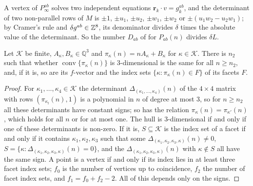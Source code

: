 A vertex of $P_\infty^{ab}$ solves two independent equations $\mathbf r_k\cdot v=g^{ab}_k$, and the determinant of two non-parallel rows of $M$ is $\pm1$, $\pm u_1$, $\pm u_2$, $\pm w_1$, $\pm w_2$ or $\pm(u_1w_2-u_2w_1)$; by Cramer's rule and $\delta g^{ab}\in\mathbb{Z}^8$, its denominator divides $\delta$ times the absolute value of the determinant.
So the number $D_{ab}$ of  for $P_{ab}(n)$ divides $\delta L$.

\begin{lemma}
\label{lem:moving-points}
Let $\mathcal K$ be finite, $A_\kappa,B_\kappa\in\mathbb Q^3$ and $\pi_\kappa(n)=nA_\kappa+B_\kappa$ for $\kappa\in\mathcal K$.
There is $n_2$ such that whether $\operatorname{conv}\{\pi_\kappa(n)\}$ is $3$-dimensional is the same for all $n\ge n_2$, and, if it is, so are its $f$-vector and the index sets $\{\kappa:\pi_\kappa(n)\in F\}$ of its facets $F$.
\end{lemma}

\begin{proof}
For $\kappa_1,\dots,\kappa_4\in\mathcal K$ the determinant $\Delta_{(\kappa_1,\dots,\kappa_4)}(n)$ of the $4\times4$ matrix with rows $(\pi_{\kappa_l}(n),1)$ is a polynomial in $n$ of degree at most $3$, so for $n\ge n_2$ all these determinants have constant signs; so has the relation $\pi_\kappa(n)=\pi_{\kappa'}(n)$, which holds for all $n$ or for at most one.
The hull is $3$-dimensional if and only if one of these determinants is non-zero.
If it is, $S\subseteq\mathcal K$ is the index set of a facet if and only if it contains $\kappa_1,\kappa_2,\kappa_3$ such that some $\Delta_{(\kappa_1,\kappa_2,\kappa_3,\kappa)}(n)\ne0$, $S=\{\kappa:\Delta_{(\kappa_1,\kappa_2,\kappa_3,\kappa)}(n)=0\}$, and the $\Delta_{(\kappa_1,\kappa_2,\kappa_3,\kappa)}(n)$ with $\kappa\notin S$ all have the same sign.
A point is a vertex if and only if its index lies in at least three facet index sets; $f_0$ is the number of vertices up to coincidence, $f_2$ the number of facet index sets, and $f_1=f_0+f_2-2$.
All of this depends only on the signs.
\end{proof}

